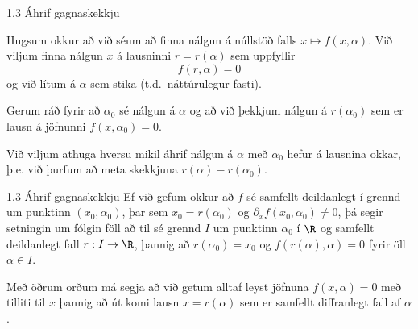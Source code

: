 \begin{frame}{1.3 Áhrif gagnaskekkju} 

\begin{block}{}
Hugsum okkur að við séum að finna nálgun á núllstöð falls $x\mapsto f(x,\alpha)$.
 Við viljum finna nálgun $x$ á lausninni $r=r(\alpha)$ sem uppfyllir 
\begin{equation*}
    f(r,\alpha) = 0
\end{equation*}
og við lítum á $\alpha$ sem stika (t.d.~náttúrulegur fasti). 
\end{block}

\pause
\begin{block}{}
Gerum ráð fyrir að $\alpha_0$ sé
nálgun á $\alpha$ og að við þekkjum nálgun á $r(\alpha_0)$ sem er
lausn á jöfnunni $f(x,\alpha_0)=0$. 
\end{block}

\pause
\begin{block}{}
Við viljum athuga hversu mikil áhrif nálgun á $\alpha$ með 
$\alpha_0$ hefur
á lausnina okkar, þ.e. við þurfum að meta skekkjuna
$r(\alpha)-r(\alpha_0)$. 
\end{block}
\end{frame}

\begin{frame}{1.3 Áhrif gagnaskekkju} 
Ef við gefum okkur að $f$ sé samfellt deildanlegt í grennd um punktinn
$(x_0,\alpha_0)$, þar sem $x_0=r(\alpha_0)$ og
${\partial}_xf(x_0,\alpha_0)\neq 0$, þá segir setningin um fólgin föll
að til sé grennd $I$ um punktinn $\alpha_0$ í $\R$ og samfellt
deildanlegt fall $r:I\to \R$, þannig að $r(\alpha_0)=x_0$ og
$f(r(\alpha),\alpha)=0$ fyrir öll $\alpha\in I$.

\pause
\smallskip
 Með öðrum orðum má
segja að við getum alltaf leyst jöfnuna $f(x,\alpha)=0$ með tilliti
til $x$ þannig að út komi lausn $x=r(\alpha)$ sem er samfellt
diffranlegt fall af $\alpha$. 
\end{frame}

